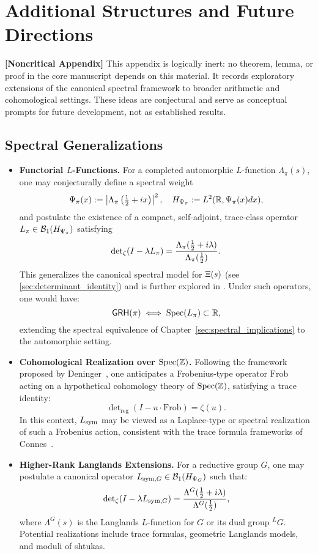 \section{Additional Structures and Future Directions}
\label{app:additional_structures}

\noindent\textbf{[Noncritical Appendix]}  
This appendix is logically inert: no theorem, lemma, or proof in the core manuscript depends on this material. It records exploratory extensions of the canonical spectral framework to broader arithmetic and cohomological settings. These ideas are conjectural and serve as conceptual prompts for future development, not as established results.

\subsection*{Spectral Generalizations}

\begin{itemize}
  \item \textbf{Functorial \( L \)-Functions.}  
  For a completed automorphic \( L \)-function \( \Lambda_\pi(s) \), one may conjecturally define a spectral weight
  \[
  \Psi_\pi(x) := \left| \Lambda_\pi\left( \tfrac{1}{2} + i x \right) \right|^2, \quad
  H_{\Psi_\pi} := L^2(\mathbb{R}, \Psi_\pi(x) dx),
  \]
  and postulate the existence of a compact, self-adjoint, trace-class operator \( L_\pi \in \mathcal{B}_1(H_{\Psi_\pi}) \) satisfying
  \[
  \det\nolimits_{\zeta}(I - \lambda L_\pi) = \frac{\Lambda_\pi(\tfrac{1}{2} + i\lambda)}{\Lambda_\pi(\tfrac{1}{2})}.
  \]
  This generalizes the canonical spectral model for \( \Xi(s) \) (see \cref{sec:determinant_identity}) and is further explored in . Under such operators, one would have:
  \[
  \mathsf{GRH}(\pi) \iff \operatorname{Spec}(L_\pi) \subset \mathbb{R},
  \]
  extending the spectral equivalence of Chapter~\ref{sec:spectral_implications} to the automorphic setting.

  \item \textbf{Cohomological Realization over \( \operatorname{Spec}(\mathbb{Z}) \).}  
  Following the framework proposed by Deninger~\cite{Deninger1998Frobenius}, one anticipates a Frobenius-type operator \( \mathrm{Frob} \) acting on a hypothetical cohomology theory of \( \operatorname{Spec}(\mathbb{Z}) \), satisfying a trace identity:
  \[
  \det\nolimits_{\mathrm{reg}}(I - u \cdot \mathrm{Frob}) = \zeta(u).
  \]
  In this context, \( L_{\mathrm{sym}} \) may be viewed as a Laplace-type or spectral realization of such a Frobenius action, consistent with the trace formula frameworks of Connes~\cite{Connes1999TraceFormula}.

  \item \textbf{Higher-Rank Langlands Extensions.}  
  For a reductive group \( G \), one may postulate a canonical operator \( L_{\mathrm{sym},G} \in \mathcal{B}_1(H_{\Psi_G}) \) such that:
  \[
  \det\nolimits_{\zeta}(I - \lambda L_{\mathrm{sym},G}) = \frac{\Lambda^G(\tfrac{1}{2} + i\lambda)}{\Lambda^G(\tfrac{1}{2})},
  \]
  where \( \Lambda^G(s) \) is the Langlands \( L \)-function for \( G \) or its dual group \( {}^L G \). Potential realizations include trace formulas, geometric Langlands models, and moduli of shtukas.
\end{itemize}

